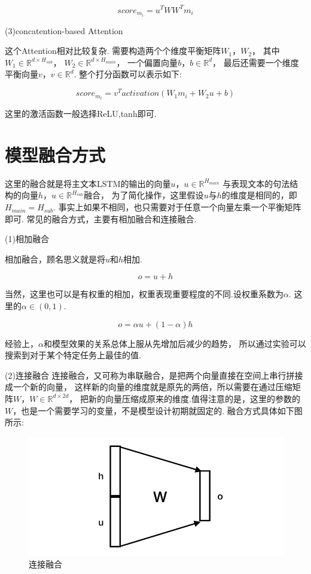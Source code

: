 \documentclass[bachelor,adobefonts]{jnuthesis}
\begin{document}
\begin{equation}
  score_{m_{i}} = u^{T}WW^{T}m_{i}
\end{equation}


(3)concatention-based Attention

这个Attention相对比较复杂.
需要构造两个个维度平衡矩阵$W_{1}$，$W_{2}$，
其中$W_{1} \in \mathbb{R}^{d \times H_{sub}}$，
$W_{2} \in \mathbb{R}^{d \times H_{main}}$，
一个偏置向量$b$，$b \in \mathbb{R}^{d}$，
最后还需要一个维度平衡向量$v$，$v \in \mathbb{R}^{d}$.
整个打分函数可以表示如下:

\begin{equation}
  score_{m_{i}} = v^{T}activation(W_{1}m_{i}+W_{2}u+b)
\end{equation}

这里的激活函数一般选择ReLU,tanh即可.



\section{模型融合方式}
这里的融合就是将主文本LSTM的输出的向量$u$，$u \in \mathbb{R}^{H_{main}}$
与表现文本的句法结构的向量$h$，$u \in \mathbb{R}^{H_{sub}}$融合，
为了简化操作，这里假设$u$与$h$的维度是相同的，即$H_{main} = H_{sub}$.
事实上如果不相同，也只需要对于任意一个向量左乘一个平衡矩阵即可.
常见的融合方式，主要有相加融合和连接融合.

(1)相加融合

相加融合，顾名思义就是将$u$和$h$相加.

\begin{equation}
  o = u + h
\end{equation}

当然，这里也可以是有权重的相加，权重表现重要程度的不同.设权重系数为$\alpha$.
这里的$\alpha \in (0,1)$.

\begin{equation}
  o = \alpha u + (1-\alpha)h
\end{equation}

经验上，$\alpha$和模型效果的关系总体上服从先增加后减少的趋势，
所以通过实验可以搜索到对于某个特定任务上最佳的值.

(2)连接融合
连接融合，又可称为串联融合，是把两个向量直接在空间上串行拼接成一个新的向量，
这样新的向量的维度就是原先的两倍，所以需要在通过压缩矩阵$W$，$W \in \mathbb{R}^{d \times 2d}$，
把新的向量压缩成原来的维度.值得注意的是，这里的参数的$W$，也是一个需要学习的变量，不是模型设计初期就固定的.
融合方式具体如下图所示:
\begin{figure}[h!]
  \centering
  \includegraphics[width=0.4\linewidth]{连接融合.png}
  \caption{连接融合}
\end{figure}
\end{document}
